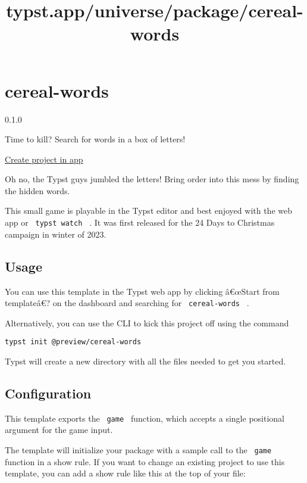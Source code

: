 \title{typst.app/universe/package/cereal-words}

\label{banner}
\label{template-thumbnail}

\section{cereal-words}\label{cereal-words}

{ 0.1.0 }

Time to kill? Search for words in a box of letters!

\href{/app?template=cereal-words&version=0.1.0}{Create project in app}

\label{readme}
Oh no, the Typst guys jumbled the letters! Bring order into this mess by
finding the hidden words.

This small game is playable in the Typst editor and best enjoyed with
the web app or \texttt{\ typst\ watch\ } . It was first released for the
24 Days to Christmas campaign in winter of 2023.

\subsection{Usage}\label{usage}

You can use this template in the Typst web app by clicking â€œStart from
templateâ€? on the dashboard and searching for \texttt{\ cereal-words\ }
.

Alternatively, you can use the CLI to kick this project off using the
command

\begin{verbatim}
typst init @preview/cereal-words
\end{verbatim}

Typst will create a new directory with all the files needed to get you
started.

\subsection{Configuration}\label{configuration}

This template exports the \texttt{\ game\ } function, which accepts a
single positional argument for the game input.

The template will initialize your package with a sample call to the
\texttt{\ game\ } function in a show rule. If you want to change an
existing project to use this template, you can add a show rule like this
at the top of your file:

